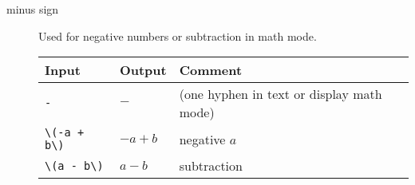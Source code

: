 \begin{description}
  \item[minus sign]
    Used for negative numbers or subtraction in math mode.
    \begin{singlespace}
      \begin{tabular}{@{}lll@{}}
        \toprule
        \bfseries Input& \bfseries Output& \bfseries Comment\\
        \midrule
        \verb+-+& \(-\)& (one hyphen in text or display math mode)\\
        \verb=\(-a + b\)=& \(-a + b\)& negative $a$\\
        \verb+\(a - b\)+& \(a - b\)& subtraction\\
        \bottomrule
      \end{tabular}
    \end{singlespace}

\end{description}


